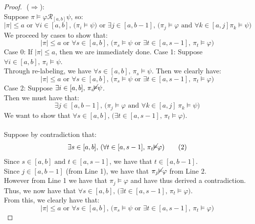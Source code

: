 \documentclass[runningheads]{llncs}
\renewcommand{\phi}{\varphi}
\begin{document}
\begin{proof} $ $\newline
($\Rightarrow$):\\
\indent Suppose $\pi \vDash \phi \mathcal{R}_{[a,b]} \psi$, so:
\[ |\pi| \leq a \text{ or } \forall i \in [a,b] \text{, (} \pi_i \vDash \psi \text{) or } \exists j \in [a,b-1] \text{, (} \pi_j \vDash \phi \text{ and } \forall k \in [a, j] \pi_k \vDash \psi \text{)} \]
We proceed by cases to show that:
\[
|\pi| \le a \text{ or } \forall s \in [a,b] \text{, (} \pi_s \vDash \psi \text{ or } \exists t \in [a, s-1] \text{, } \pi_t \vDash \phi \text{)} \tag{A1}
\]
\indent Case 0: If $|\pi| \leq a$, then we are immediately done.
\indent Case 1: Suppose $\forall i \in [a,b] \text{, } \pi_i \vDash \psi$.\\
\indent Through re-labeling, we have $\forall s \in [a,b] \text{, } \pi_s \vDash \psi$. Then we clearly have:
\[
|\pi| \le a \text{ or } \forall s \in [a,b] \text{, (} \pi_s \vDash \psi \text{ or } \exists t \in [a, s-1] \text{, } \pi_t \vDash \phi \text{)} \tag{A1}
\]
\indent Case 2: Suppose $\exists i \in [a,b] \text{, } \pi_i \cancel{\vDash} \psi$.\\
\indent \indent Then we must have that:
\[ \exists j \in [a,b-1] \text{, (} \pi_j \vDash \phi \text{ and } \forall k \in [a, j] \ \pi_k \vDash \psi \text{)} \tag{1} \]
\indent \indent We want to show that $ \forall s \in [a,b] \text{, (} \exists t \in [a, s-1] \text{, } \pi_t \vDash \phi \text{)}$.\\
\\
\indent \indent Suppose by contradiction that: 
\[ \exists s \in [a,b] \text{, (} \forall t \in [a, s-1] \text{, } \pi_t \cancel{\vDash} \phi \text{)} \tag{2} \]
\indent \indent Since $s \in [a,b] \text{ and }  t \in [a, s-1]$, we have that $t \in [a,b-1]$.\\
\indent \indent Since $j \in [a,b-1]$ (from Line 1), we have that $\pi_j \cancel{\vDash} \phi$ from Line 2.\\
\indent \indent However from Line 1 we have that $\pi_j \vDash \phi$ and have thus derived a contradiction.\\
\indent \indent Thus, we now have that $ \forall s \in [a,b] \text{, (} \exists t \in [a, s-1] \text{, } \pi_t \vDash \phi \text{)}$.\\ \indent \indent From this, we clearly have that:
\[
|\pi| \le a \text{ or } \forall s \in [a,b] \text{, (} \pi_s \vDash \psi \text{ or } \exists t \in [a, s-1] \text{, } \pi_t \vDash \phi \text{)} \tag{A1}
\]
$ $ \newline

\end{proof}
\end{document}
